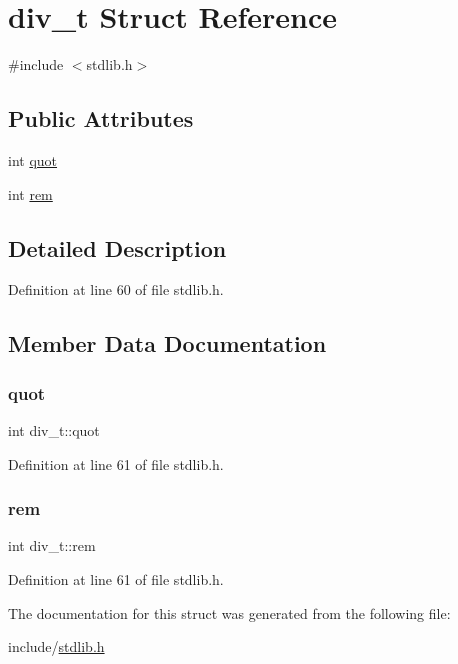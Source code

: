 \hypertarget{structdiv__t}{}\section{div\+\_\+t Struct Reference}
\label{structdiv__t}


{\ttfamily \#include $<$stdlib.\+h$>$}

\subsection*{Public Attributes}
\begin{DoxyCompactItemize}
\item 
int \mbox{\hyperlink{structdiv__t_a0b9dda2884048daa68ca4aaa12b17b9a}{quot}}
\item 
int \mbox{\hyperlink{structdiv__t_ac64389de252de53eda8b4f8dbb7c623f}{rem}}
\end{DoxyCompactItemize}


\subsection{Detailed Description}


Definition at line 60 of file stdlib.\+h.



\subsection{Member Data Documentation}
\mbox{\label{structdiv__t_a0b9dda2884048daa68ca4aaa12b17b9a}} 
\subsubsection{\texorpdfstring{quot}{quot}}
{\footnotesize\ttfamily int div\+\_\+t\+::quot}



Definition at line 61 of file stdlib.\+h.

\mbox{\label{structdiv__t_ac64389de252de53eda8b4f8dbb7c623f}} 
\subsubsection{\texorpdfstring{rem}{rem}}
{\footnotesize\ttfamily int div\+\_\+t\+::rem}



Definition at line 61 of file stdlib.\+h.



The documentation for this struct was generated from the following file\+:\begin{DoxyCompactItemize}
\item 
include/\mbox{\hyperlink{stdlib_8h}{stdlib.\+h}}\end{DoxyCompactItemize}
